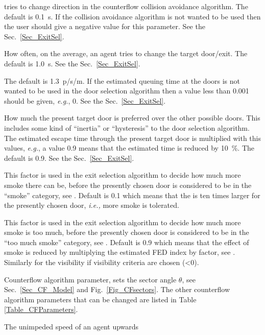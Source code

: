 \documentclass[12pt,a4paper,final,twoside]{stylevk}
\begin{document}
\begin{description}
  tries to change direction in the counterflow collision avoidance
  algorithm.  The default is 0.1~s.  If the collision avoidance
  algorithm is not wanted to be used then the user should give a
  negative value for this parameter.  See the Sec.~\ref{Sec_ExitSel}.
%
\item[\Timts{TAU\_CHANGE\_DOOR}] How often, on the average, an agent
  tries to change the target door/exit.  The default is 1.0~s.  See
  the Sec.~\ref{Sec_ExitSel}.
%
\item[\Timts{FAC\_DOOR\_QUEUE}] The default is 1.3~p/s/m.  If the
  estimated queuing time at the doors is not wanted to be used in the
  door selection algorithm then a value less than 0.001 should be
  given, \emph{e.g.}, 0.  See the Sec.~\ref{Sec_ExitSel}.
%
\item[\Timts{FAC\_DOOR\_WAIT}] How much the present target door is
  preferred over the other possible doors.  This includes some kind of
  ``inertia'' or ``hysteresis'' to the door selection algorithm.  The
  estimated escape time through the present target door is multiplied
  with this values, \emph{e.g.}, a value 0.9 means that the estimated
  time is reduced by 10~\%.  The default is 0.9.  See the
  Sec.~\ref{Sec_ExitSel}.
%
\item[\Timts{FAC\_DOOR\_OLD}] This factor is used in the exit
  selection algorithm to decide how much more smoke there can be,
  before the presently chosen door is considered to be in the
  ``smoke'' category, see .  Default is 0.1
  which means that the  is ten times larger for
  the presently chosen door, \emph{i.e.,} more smoke is tolerated.
%
\item[\Timts{FAC\_DOOR\_OLD2}] This factor is used in the exit
  selection algorithm to decide how much more smoke is too much,
  before the presently chosen door is considered to be in the ``too
  much smoke'' category, see .  Default is 0.9
  which means that the effect of smoke is reduced by multiplying the
  estimated FED index by factor, see .
  Similarly for the visibility if visibility criteria are chosen
  (<0).
%
\item[\Timts{THETA\_SECTOR}] Counterflow algorithm parameter, sets the
  sector angle $\theta$, see Sec.~\ref{Sec_CF_Model} and
  Fig.~\ref{Fig_CFsectors}.  The other counterflow algorithm
  parameters that can be changed are listed in Table
  \ref{Table_CFParameters}.
%
\item[\Timts{FAC\_V0\_UP}] The unimpeded speed of an agent upwards

\end{description}
\end{document}
